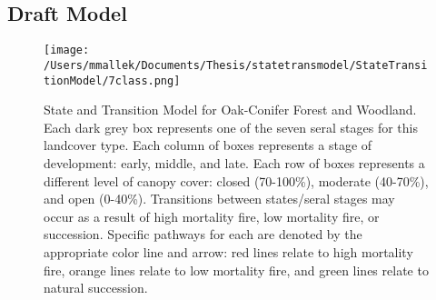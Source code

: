 \subsection*{Draft Model}
\begin{figure}[htbp]
\centering
\texttt{[image: /Users/mmallek/Documents/Thesis/statetransmodel/StateTransitionModel/7class.png]}
\caption{State and Transition Model for Oak-Conifer Forest and Woodland. Each dark grey box represents one of the seven seral stages for this landcover type. Each column of boxes represents a stage of development: early, middle, and late. Each row of boxes represents a different level of canopy cover: closed (70-100\%), moderate (40-70\%), and open (0-40\%). Transitions between states/seral stages may occur as a result of high mortality fire, low mortality fire, or succession. Specific pathways for each are denoted by the appropriate color line and arrow: red lines relate to high mortality fire, orange lines relate to low mortality fire, and green lines relate to natural succession.} 
\label{transmodel}
\end{figure}

